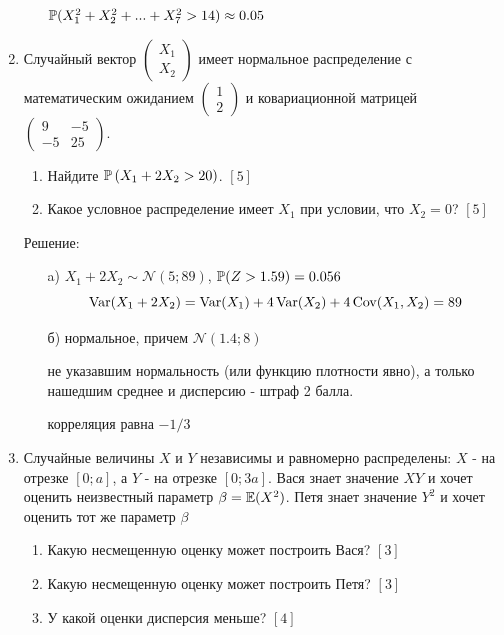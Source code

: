 \documentclass[12pt, a4paper]{article}\usepackage[]{graphicx}\usepackage[]{color}
\begin{document}
\begin{enumerate}
\begin{enumerate}
$\P(X_{1}^{2}+X_{2}^{2}+...+X_{7}^{2}>14)\approx 0.05$
\end{enumerate}

\item Случайный вектор  $\left(\begin{array}{c}
{X_{1} } \\ {X_{2} }
\end{array}\right)$  имеет нормальное распределение с
математическим ожиданием  $\left(\begin{array}{c} {1} \\ {2}
\end{array}\right)$  и ковариационной матрицей
$\left(\begin{array}{cc} {9} & {-5} \\ {-5} & {25}
\end{array}\right)$.
\begin{enumerate}
\item Найдите  $\P\left(X_{1} +2X_{2} >20\right)$. $[5]$
\item Какое условное распределение имеет $X_{1}$ при условии, что $X_{2}=0$? $[5]$
\end{enumerate}

Решение:
\begin{enumerate}
\item[a)] $X_{1}+2X_{2}\sim \mathcal{N}(5;89)$, $\P(Z>1.59)=0.056$
\[
\Var(X_1+2X_2)=\Var(X_1)+4\Var(X_2)+4\Cov(X_1,X_2)=89
\]
\item[б)] нормальное, причем $\mathcal{N}(1.4;8)$

не указавшим нормальность (или функцию плотности явно), а только нашедшим среднее и дисперсию - штраф 2 балла.

корреляция равна $-1/3$
\end{enumerate}




\item Случайные величины $X$ и $Y$ независимы и равномерно распределены: $X$ - на отрезке $[0;a]$, а $Y$ - на отрезке $[0;3a]$.
Вася знает значение $XY$ и хочет оценить неизвестный параметр $\beta=\E(X^{2})$.
Петя знает значение $Y^2$ и хочет оценить тот же параметр $\beta$
\begin{enumerate}
\item Какую несмещенную оценку может построить Вася? $[3]$
\item Какую несмещенную оценку может построить Петя? $[3]$
\item У какой оценки дисперсия меньше? $[4]$
\end{enumerate}


\end{enumerate}
\end{document}

